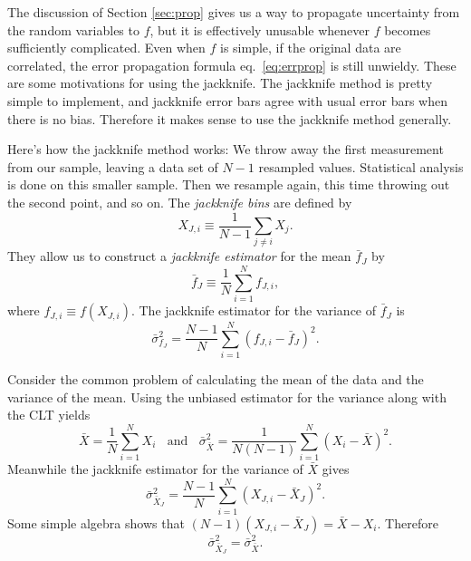 The discussion of Section \ref{sec:prop} gives us a way to propagate 
uncertainty from the random variables to $f$, but it is effectively 
unusable whenever $f$ becomes sufficiently complicated. 
Even when $f$ is simple, if the original data are correlated, the 
error propagation formula eq.~\eqref{eq:errprop} is still 
unwieldy. These are some motivations for using the jackknife.
The jackknife method is pretty simple to implement, and jackknife error 
bars agree with usual error bars when there is no bias.
Therefore it makes sense to use the jackknife method generally. 

Here's how the jackknife method works: We throw away the first measurement 
from our sample, leaving a data set of $N-1$ resampled values. Statistical
analysis is done on this smaller sample. Then we resample again, this time
throwing out the second point, and so on.
The {\it jackknife bins} are defined by
\begin{equation}
  X_{J,i}\equiv\frac{1}{N-1}\sum_{j\neq i}X_j.
\end{equation}
They allow us to construct a {\it jackknife estimator}
 for the mean $\bar{f}_J$ by
\begin{equation}\label{eq:jackmean}
  \bar{f}_J\equiv\frac{1}{N}\sum_{i=1}^N f_{J,i},
\end{equation}
where $f_{J,i}\equiv f(X_{J,i})$. The jackknife estimator for the 
variance of $\bar{f}_J$ is
\begin{equation}\label{eq:jackvar}
  \bar\sigma^2_{f_J}=\frac{N-1}{N}\sum_{i=1}^N(f_{J,i}-\bar{f}_J)^2.
\end{equation}
\begin{example*}{}{}
  Consider the common problem of calculating the mean of the data and
  the variance of the mean. Using the unbiased estimator for the variance
  along with the CLT yields
  \begin{equation}
    \bar{X}=\frac{1}{N}\sum_{i=1}^N X_i~~~~\text{and}~~~~
     \bar{\sigma}^2_{\bar{X}}=\frac{1}{N(N-1)}\sum_{i=1}^N(X_i-\bar{X})^2.
  \end{equation}
  Meanwhile the jackknife estimator for the variance of $\bar{X}$ gives
  \begin{equation}
    \bar\sigma_{\bar{X}_J}^2=\frac{N-1}{N}\sum_{i=1}^N(X_{J,i}-\bar{X}_J)^2.
  \end{equation}
  Some simple algebra shows that $(N-1)(X_{J,i}-\bar{X}_J)=\bar{X}-X_i$.
  Therefore
  \begin{equation}
    \bar\sigma_{\bar{X}_J}^2=\bar{\sigma}^2_{\bar{X}}.
  \end{equation}
\end{example*}

